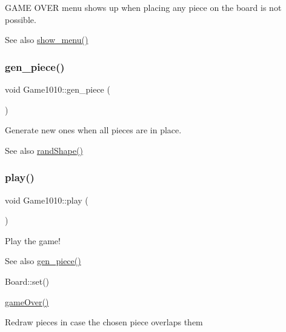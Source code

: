 G\+A\+ME O\+V\+ER menu shows up when placing any piece on the board is not possible. 

\begin{DoxySeeAlso}{See also}
\mbox{\hyperlink{class_game1010_a99d6f53c3073861fe37ef67caa073840}{show\+\_\+menu()}} 
\end{DoxySeeAlso}
\mbox{\label{class_game1010_a9576170947a355682c922cb648432b9e}} 
\subsubsection{\texorpdfstring{gen\+\_\+piece()}{gen\_piece()}}
{\footnotesize\ttfamily void Game1010\+::gen\+\_\+piece (\begin{DoxyParamCaption}{ }\end{DoxyParamCaption})\hspace{0.3cm}{\ttfamily [inline]}}



Generate new ones when all pieces are in place. 

\begin{DoxySeeAlso}{See also}
\mbox{\hyperlink{class_game1010_a9b86f7bf4ad3af111014ad33a781ffe5}{rand\+Shape()}} 
\end{DoxySeeAlso}
\mbox{\label{class_game1010_afa18a3a81b8966417a228459a5bebf53}} 
\subsubsection{\texorpdfstring{play()}{play()}}
{\footnotesize\ttfamily void Game1010\+::play (\begin{DoxyParamCaption}{ }\end{DoxyParamCaption})\hspace{0.3cm}{\ttfamily [inline]}}



Play the game! 

\begin{DoxySeeAlso}{See also}
\mbox{\hyperlink{class_game1010_a9576170947a355682c922cb648432b9e}{gen\+\_\+piece()}} 

Board\+::set() 

\mbox{\hyperlink{class_game1010_a3bc296b7ba6bffeda3baceb1240190b6}{game\+Over()}} 
\end{DoxySeeAlso}
Redraw pieces in case the chosen piece overlaps them

